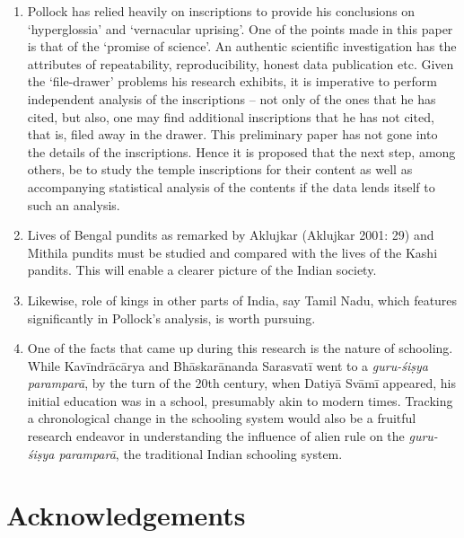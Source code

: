 \begin{enumerate}
\item Pollock has relied heavily on inscriptions to provide his conclusions on ‘hyperglossia’ and ‘vernacular uprising’. One of the points made in this paper is that of the ‘promise of science’. An authentic scientific investigation has the attributes of repeatability, reproducibility, honest data publication etc. Given the ‘file-drawer’ problems his research exhibits, it is imperative to perform independent analysis of the inscriptions – not only of the ones that he has cited, but also, one may find additional inscriptions that he has not cited, that is, filed away in the drawer. This preliminary paper has not gone into the details of the inscriptions. Hence it is proposed that the next step, among others, be to study the temple inscriptions for their content as well as accompanying statistical analysis of the contents if the data lends itself to such an analysis.

 \item Lives of Bengal pundits as remarked by Aklujkar (Aklujkar 2001: 29) and Mithila pundits must be studied and compared with the lives of the Kashi pandits. This will enable a clearer picture of the Indian society.

 \item Likewise, role of kings in other parts of India, say Tamil Nadu, which features significantly in Pollock’s analysis, is worth pursuing.

 \item One of the facts that came up during this research is the nature of schooling. While Kavīndrācārya and Bhāskarānanda Sarasvatī went to a \textit{guru-śiṣya paramparā}, by the turn of the 20th century, when Datiyā Svāmī appeared, his initial education was in a school, presumably akin to modern times. Tracking a chronological change in the schooling system would also be a fruitful research endeavor in understanding the influence of alien rule on the \textit{guru-śiṣya paramparā}, the traditional Indian schooling system.

\end{enumerate}


\section*{Acknowledgements}

